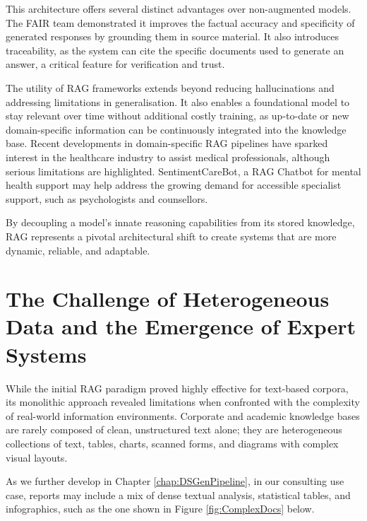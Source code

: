 \documentclass[12pt,twoside]{report}
\begin{document}
This architecture offers several distinct advantages over non-augmented models. The FAIR team demonstrated it improves the factual accuracy and specificity of generated responses by grounding them in source material.\cite{FAIRRAG} It also introduces traceability, as the system can cite the specific documents used to generate an answer, a critical feature for verification and trust.

The utility of RAG frameworks extends beyond reducing hallucinations and addressing limitations in generalisation. It also enables a foundational model to stay relevant over time without additional costly training\cite{TrainingFrontierAICost}, as up-to-date or new domain-specific information can be continuously integrated into the knowledge base. Recent developments in domain-specific RAG pipelines have sparked interest in the healthcare industry to assist medical professionals, although serious limitations are highlighted\cite{RAGinHealthCare}. SentimentCareBot\cite{SentimentCareBot}, a RAG Chatbot for mental health support may help address the growing demand for accessible specialist support, such as psychologists and counsellors.

By decoupling a model's innate reasoning capabilities from its stored knowledge, RAG represents a pivotal architectural shift to create systems that are more dynamic, reliable, and adaptable.

\section{The Challenge of Heterogeneous Data and the Emergence of Expert Systems}

While the initial RAG paradigm proved highly effective for text-based corpora, its monolithic approach revealed limitations when confronted with the complexity of real-world information environments. Corporate and academic knowledge bases are rarely composed of clean, unstructured text alone; they are heterogeneous collections of text, tables, charts, scanned forms, and diagrams with complex visual layouts.

As we further develop in Chapter \ref{chap:DSGenPipeline}, in our consulting use case, reports may include a mix of dense textual analysis, statistical tables, and infographics, such as the one shown in Figure \ref{fig:ComplexDocs} below.
\end{document}

